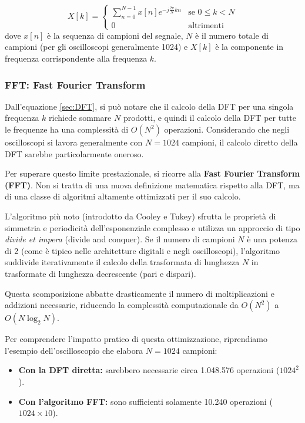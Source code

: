 \begin{equation}
    \label{sec:DFT}
    X[k] = \begin{cases}
    \sum_{n=0}^{N-1} x[n] e^{-j \frac{2\pi}{N} kn} & \text{se } 0 \leq k < N\\
    0 & \text{altrimenti}
    \end{cases}
\end{equation}
dove $x[n]$ è la sequenza di campioni del segnale, $N$ è il numero totale di campioni (per gli oscilloscopi generalmente 1024) e $X[k]$ è la componente in frequenza corrispondente alla frequenza $k$.

\subsubsection{FFT: Fast Fourier Transform}
Dall'equazione \ref{sec:DFT}, si può notare che il calcolo della DFT per una singola frequenza $k$ richiede sommare $N$ prodotti, e quindi il calcolo della DFT per tutte le frequenze ha una complessità di \textbf{$O(N^2)$} operazioni. Considerando che negli oscilloscopi si lavora generalmente con $N=1024$ campioni, il calcolo diretto della DFT sarebbe particolarmente oneroso. 

Per superare questo limite prestazionale, si ricorre alla \textbf{Fast Fourier Transform (FFT)}. Non si tratta di una nuova definizione matematica rispetto alla DFT, ma di una classe di algoritmi altamente ottimizzati per il suo calcolo. 

L'algoritmo più noto (introdotto da Cooley e Tukey) sfrutta le proprietà di simmetria e periodicità dell'esponenziale complesso e utilizza un approccio di tipo \textit{divide et impera} (divide and conquer). Se il numero di campioni $N$ è una potenza di 2 (come è tipico nelle architetture digitali e negli oscilloscopi), l'algoritmo suddivide iterativamente il calcolo della trasformata di lunghezza $N$ in trasformate di lunghezza decrescente (pari e dispari).

Questa scomposizione abbatte drasticamente il numero di moltiplicazioni e addizioni necessarie, riducendo la complessità computazionale da $O(N^2)$ a $O(N \log_2 N)$. 

Per comprendere l'impatto pratico di questa ottimizzazione, riprendiamo l'esempio dell'oscilloscopio che elabora $N = 1024$ campioni:
\begin{itemize}
    \item \textbf{Con la DFT diretta:} sarebbero necessarie circa 1.048.576 operazioni ($1024^2$).
    \item \textbf{Con l'algoritmo FFT:} sono sufficienti solamente 10.240 operazioni ($1024 \times 10$).
\end{itemize}

